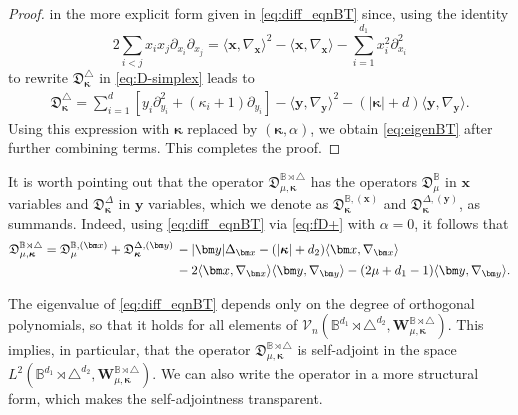 \documentclass{amsart}
\theoremstyle{remark}
\def\la{{\langle}}
\def\ra{{\rangle}}
\def\fD{{\mathfrak D}}
\def\fR{{\mathfrak R}}
\def\a{{\alpha}}
\def\k{{\kappa}}
\def\la{{\langle}}
\def\ra{{\rangle}}
\def\xb{{\bm x}}
\def\CV{{\mathcal V}}
\def\BB{{\mathbb B}}
\def\bk{{\boldsymbol{\kappa}}}
\begin{document}
\begin{proof}
in the more explicit form given in \eqref{eq:diff_eqnBT} since, using the identity
\begin{equation}\label{eq:double_sum}
2 \sum_{i< j} x_i x_j \partial_{x_i} \partial_{x_j} = \la \xb, \nabla_\xb\ra^2 - \la \xb,\nabla_\xb\ra -\sum_{i=1}^{d_1} x_i^2
 \partial_{x_i}^2
 \end{equation}
to rewrite $\fD_{\bk}^{\triangle}$ in \eqref{eq:D-simplex} leads to 
\begin{align} \label{eq:Dsimplex2}
  \fD_{\bk}^{\triangle} =  \sum_{i=1}^{d} \left[ y_i \partial_{y_i}^2 + (\k_i+1) \partial_{y_i} \right] -  \la \bm y, \nabla_{\bm y} \ra^2
   - (|\bk|+d) \la \bm y, \nabla_{\bm y} \ra .
\end{align}
Using this expression with $\bk$ replaced by $(\bk, \a)$, we obtain \eqref{eq:eigenBT} after further combining terms. 
This completes the proof. 
\end{proof}

It is worth pointing out that the operator $\fD_{\mu, \bk}^{\BB\rtimes \triangle}$ has the operators  $\fD_\mu^\BB$ in
$\xb$ variables and $\fD_\bk^\Delta$ in $\bm y$ variables, which we denote as $\fD_\bk^{\BB, (\bm x)}$ 
and $\fD_\bk^{\Delta, (\bm y)}$, as summands. Indeed, using \eqref{eq:diff_eqnBT} 
via \eqref{eq:fD+} with $\a = 0$, it follows that 
\begin{align*}%
   \fD_{\mu,\bk}^{\BB\rtimes \triangle} = \fD_\mu^{\BB, (\bm x)}+\fD_\bk^{\Delta, (\bm y)}
   \, & -|\bm y| \Delta_{\bm x}  - (|\bk| +d_2)  \la \bm x, \nabla_{\bm x} \ra   \\
   \,&  -2 \la \bm x, \nabla_{\bm x} \ra \la \bm y, \nabla_{\bm y} \ra 
        - (2\mu+d_1-1)\la \bm y, \nabla_{\bm y} \ra. \notag 
\end{align*}

The eigenvalue of \eqref{eq:diff_eqnBT} depends only on the degree of orthogonal polynomials, so that it holds for all 
elements of $\CV_n(\BB^{d_1} \rtimes \triangle^{d_2}, \bm W_{\mu,\bk}^{\BB\rtimes \triangle})$. This implies, in particular, that the operator 
$\fD_{\mu,\bk}^{\BB\rtimes \triangle}$ is self-adjoint in the space $L^2\left(\BB^{d_1} \rtimes \triangle^{d_2}, 
\bm W_{\mu,\bk}^{\BB\rtimes \triangle}\right)$. We can also write the operator in a more structural form, which makes 
the self-adjointness transparent. 
\end{document}

